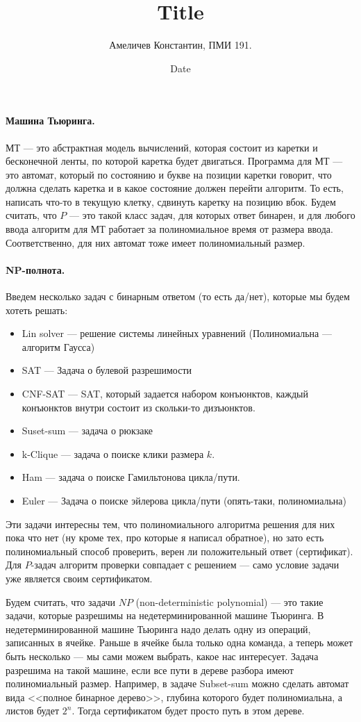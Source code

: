 \documentclass[12pt]{article}
\title{Title}
\author{Амеличев Константин, ПМИ 191.}
\date{Date}
\begin{document}
\paragraph{Машина Тьюринга.} МТ --- это абстрактная модель вычислений, которая состоит из каретки и бесконечной ленты, по которой каретка будет двигаться. Программа для МТ --- это автомат, который по состоянию и букве на позиции каретки говорит, что должна сделать каретка и в какое состояние должен перейти алгоритм. То есть, написать что-то в текущую клетку, сдвинуть каретку на позицию вбок. Будем считать, что $P$ --- это такой класс задач, для которых ответ бинарен, и для любого ввода алгоритм для МТ работает за полиномиальное время от размера ввода. Соответственно, для них автомат тоже имеет полиномиальный размер.

\paragraph{NP-полнота.}  Введем несколько задач с бинарным ответом (то есть да/нет), которые мы будем хотеть решать:

\begin{itemize}
	\item Lin solver --- решение системы линейных уравнений (Полиномиальна --- алгоритм Гаусса)
	\item SAT --- Задача о булевой разрешимости
	\item CNF-SAT --- SAT, который задается набором конъюнктов, каждый конъюнктов внутри состоит из скольки-то дизъюнктов.
	\item Suset-sum --- задача о рюкзаке
	\item k-Clique --- задача о поиске клики размера $k$.
	\item Ham --- задача о поиске Гамильтонова цикла/пути.
	\item Euler --- Задача о поиске эйлерова цикла/пути (опять-таки, полиномиальна)
\end{itemize}

Эти задачи интересны тем, что полиномиального алгоритма решения для них пока что нет (ну кроме тех, про которые я написал обратное), но зато есть полиномиальный способ проверить, верен ли положительный ответ (сертификат). Для $P$-задач алгоритм проверки совпадает с решением --- само условие задачи уже является своим сертификатом.

Будем считать, что задачи $NP$ (non-deterministic polynomial) --- это такие задачи, которые разрешимы на недетерминированной машине Тьюринга. В недетерминированной машине Тьюринга надо делать одну из операций, записанных в ячейке. Раньше в ячейке была только одна команда, а теперь может быть несколько --- мы сами можем выбрать, какое нас интересует. Задача разрешима на такой машине, если все пути в дереве разбора имеют полиномиальный размер. Например, в задаче Subset-sum можно сделать автомат вида <<полное бинарное дерево>>, глубина которого будет полиномиальна, а листов будет $2^n$. Тогда сертификатом будет просто путь в этом дереве.
\end{document}
